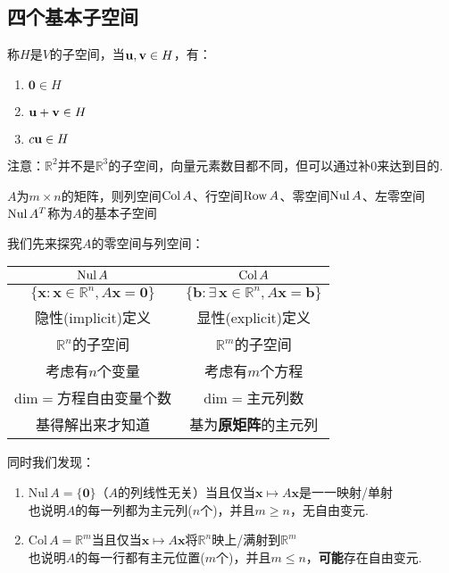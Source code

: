 \subsection{四个基本子空间}
\begin{definition}[子空间]
称$H$是$V$的子空间，当$\mathbf{u},\mathbf{v}\in H$，有：
\begin{enumerate}
	\itemsep -5pt
	\item $\mathbf{0}\in H$
	\item $\mathbf{u}+\mathbf{v}\in H$
	\item $c\mathbf{u}\in H$
\end{enumerate}
注意：$\mathbb{R}^2$并不是$\mathbb{R}^3$的子空间，向量元素数目都不同，但可以通过补$0$来达到目的.
\end{definition}
\begin{definition}[基本子空间]
$A$为$m\times n$的矩阵，则列空间$\mathrm{Col}\, A$、行空间$\mathrm{Row}\, A$、零空间$\mathrm{Nul}\, A$、左零空间$\mathrm{Nul}\, A^T$称为$A$的基本子空间
\end{definition}
\label{nul_and_col}
我们先来探究$A$的零空间与列空间：
\renewcommand\arraystretch{1.2}
\begin{table}[!htbp]%
\begin{center}
\begin{tabular}{|c|c|}
\hline
$\mathrm{Nul}\, A$ & $\mathrm{Col}\, A$ \\ \hline
$\{\mathbf{x}:\mathbf{x}\in\mathbb{R}^n,A\mathbf{x}=\mathbf{0}\}$ & $\{\mathbf{b}:\exists\,\mathbf{x}\in\mathbb{R}^n,A\mathbf{x}=\mathbf{b}\}$\\ \hline
隐性(implicit)定义 & 显性(explicit)定义 \\ \hline
$\mathbb{R}^n$的子空间 & $\mathbb{R}^m$的子空间\\ \hline
考虑有$n$个变量 & 考虑有$m$个方程\\ \hline
$\mathrm{dim}=$方程自由变量个数 & $\mathrm{dim}=$主元列数 \\ \hline
基得解出来才知道 & 基为\textbf{原矩阵}的主元列\\
\hline
\end{tabular}
\end{center}
\end{table}
\renewcommand\arraystretch{1}
\par 同时我们发现：
\begin{enumerate}
	\itemsep -3pt
	\item $\mathrm{Nul}\, A=\{\mathbf{0}\}$（$A$的列线性无关）当且仅当$\mathbf{x}\mapsto A\mathbf{x}$是一一映射/单射\\
		也说明$A$的每一列都为主元列($n$个)，并且$m\geq n$，无自由变元.
	\item $\mathrm{Col}\, A=\mathbb{R}^m$当且仅当$\mathbf{x}\mapsto A\mathbf{x}$将$\mathbb{R}^n$映上/满射到$\mathbb{R}^m$\\
		也说明$A$的每一行都有主元位置($m$个)，并且$m\leq n$，\textbf{可能}存在自由变元.
\end{enumerate}
